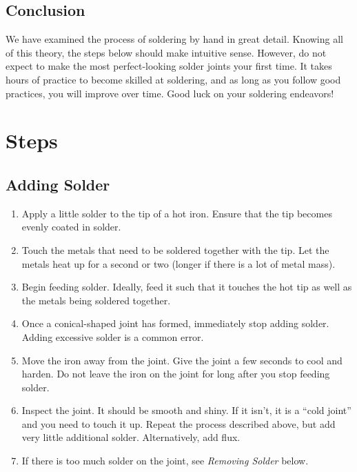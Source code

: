 \subsection{Conclusion}
We have examined the process of soldering by hand in great detail. Knowing all of this theory, the steps below should make intuitive sense. However, do not expect to make the most perfect-looking solder joints your first time. It takes hours of practice to become skilled at soldering, and as long as you follow good practices, you will improve over time. Good luck on your soldering endeavors!

\pagebreak

\section{Steps}
\subsection{Adding Solder}
\begin{enumerate}
    \item Apply a little solder to the tip of a hot iron. Ensure that the tip becomes evenly coated in solder.
    \item Touch the metals that need to be soldered together with the tip. Let the metals heat up for a second or two (longer if there is a lot of metal mass).
    \item Begin feeding solder. Ideally, feed it such that it touches the hot tip as well as the metals being soldered together.
    \item Once a conical-shaped joint has formed, immediately stop adding solder. Adding excessive solder is a common error.
    \item Move the iron away from the joint. Give the joint a few seconds to cool and harden. Do not leave the iron on the joint for long after you stop feeding solder.
    \item Inspect the joint. It should be smooth and shiny. If it isn't, it is a ``cold joint'' and you need to touch it up. Repeat the process described above, but add very little additional solder. Alternatively, add flux.
    \item If there is too much solder on the joint, see \textit{Removing Solder} below.
\end{enumerate}
